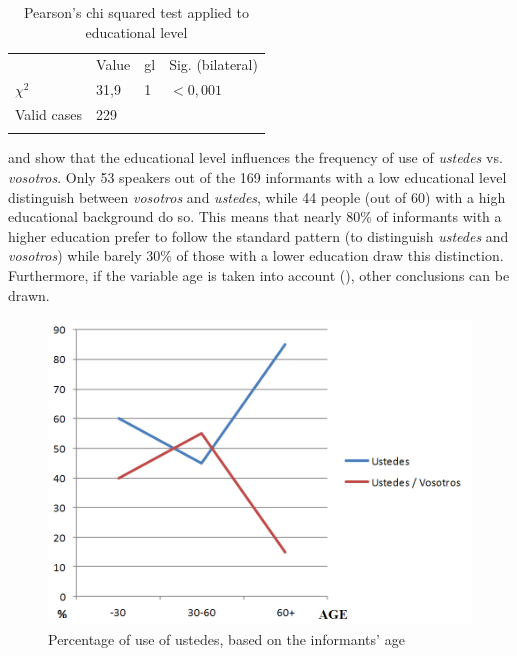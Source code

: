 \documentclass[output=paper]{LSP/langsci}
\begin{document}
\begin{table}[b]
\begin{tabular}{llll}
\lsptoprule
\multicolumn{4}{c}{\bfseries Pearson’s chi squared}\\
\midrule
& Value & gl & 
\begin{minipage}[t]{0.2\textwidth}Sig. (bilateral)\end{minipage}  \\
\midrule
\begin{minipage}[t]{0.15\textwidth}$\chi^2$ \end{minipage} & 31,9 & 1 & $<0,001$ \\
\begin{minipage}[t]{0.15\textwidth}Valid cases\end{minipage} & 229 &  & \\
\lspbottomrule
\end{tabular}
\caption{Pearson’s chi squared test applied to educational level} 
\label{tab:lara:9}
\end{table}
 


 and  show that the educational level influences the frequency of use of \textit{ustedes} vs. \textit{vosotros}. Only 53 speakers out of the 169 informants with a low educational level distinguish between \textit{vosotros} and \textit{ustedes}, while 44 people (out of 60) with a high educational background do so. This means that nearly 80\% of informants with a higher education prefer to follow the standard pattern (to distinguish \textit{ustedes} and \textit{vosotros}) while barely 30\% of those with a lower education draw this distinction. Furthermore, if the variable age is taken into account (), other conclusions can be drawn.

\begin{figure}
\includegraphics[width=\textwidth]{illustrations/lara_fig6}
\caption{Percentage of use of ustedes, based on the informants' age}
\label{fig:lara:6}
\end{figure}
\end{document}
